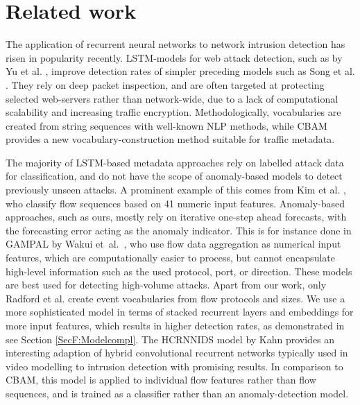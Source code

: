 \section{Related work}\label{SecF:Related work}

The application of recurrent neural networks to network intrusion detection has risen in popularity recently. LSTM-models for web attack detection, such as by Yu et al. \cite{yu2018attention}, improve detection rates of simpler preceding models such as Song et al. \cite{song2009spectrogram}. They rely on deep packet inspection, and are often targeted at protecting selected web-servers rather than network-wide, due to a lack of computational scalability and increasing traffic encryption. Methodologically, vocabularies are created from string sequences with well-known NLP methods, while CBAM provides a new vocabulary-construction method suitable for traffic metadata.

The majority of LSTM-based metadata approaches rely on labelled attack data for classification, and do not have the scope of anomaly-based models to detect previously unseen attacks. %
A prominent example of this comes from Kim et al. \cite{kim2016long}, who classify flow sequences based on 41 numeric input features. %
Anomaly-based approaches, such as ours, mostly rely on iterative one-step ahead forecasts, with the forecasting error acting as the anomaly indicator. This is for instance done in GAMPAL by Wakui et~al.~\cite{wakui2019gampal}, who use flow data aggregation  as numerical input features, which are computationally easier to process, but cannot encapsulate high-level information such as the used protocol, port, or direction. These models are best used for detecting high-volume attacks.
Apart from our work, only Radford et al. \cite{radford2018network} create event vocabularies from flow protocols and sizes. We use a more sophisticated model in terms of stacked recurrent layers and embeddings for more input features, which results in higher detection rates, as demonstrated in see Section \ref{SecF:Modelcompl}. The HCRNNIDS model by Kahn provides an interesting adaption of hybrid convolutional recurrent networks typically used in video modelling to intrusion detection \cite{khan2021hcrnnids} with promising results. In comparison to CBAM, this model is applied to individual flow features rather than flow sequences, and is trained as a classifier rather than an anomaly-detection model.  

